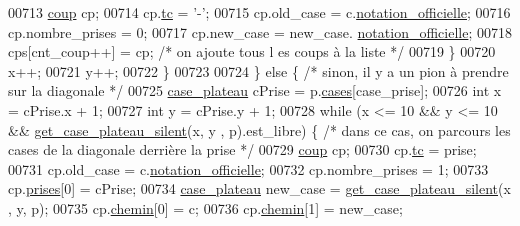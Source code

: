 \begin{DoxyCode}
00713                                         \hyperlink{structcoup}{coup} cp;
00714                                         cp.\hyperlink{structcoup_aa33da004dccb192cb33bc00c26c6e859}{tc} = \textcolor{charliteral}{'-'};
00715                                         cp.old\_case = c.\hyperlink{structcase__plateau_ad510581b324604a9cf685cbb769a421a}{notation_officielle};
00716                                         cp.nombre\_prises = 0;
00717                                         cp.new\_case = new\_case.
      \hyperlink{structcase__plateau_ad510581b324604a9cf685cbb769a421a}{notation_officielle};
00718                                         cps[cnt\_coup++] = cp; \textcolor{comment}{/* on ajoute tous l
      es coups à la liste */}
00719                                 \}
00720                                 x++;
00721                                 y++;
00722                         \}
00723 
00724                 \} \textcolor{keywordflow}{else} \{ \textcolor{comment}{/* sinon, il y a un pion à prendre sur la diagonale */}
00725                         \hyperlink{structcase__plateau}{case_plateau} cPrise = p.\hyperlink{structplateau_a6afaa60f594542e0d742b0c6d3223392}{cases}[case\_prise];
00726                         \textcolor{keywordtype}{int} x = cPrise.x + 1;
00727                         \textcolor{keywordtype}{int} y = cPrise.y + 1;
00728                         \textcolor{keywordflow}{while} (x <= 10 && y <= 10 && \hyperlink{plateau_8h_a60a8f706865d0ae9087f8d65d4667655}{get_case_plateau_silent}(x, y
      , p).est\_libre) \{ \textcolor{comment}{/* dans ce cas, on parcours les cases de la diagonale derrière 
      la prise */}
00729                                 \hyperlink{structcoup}{coup} cp;
00730                                 cp.\hyperlink{structcoup_aa33da004dccb192cb33bc00c26c6e859}{tc} = prise;
00731                                 cp.old\_case = c.\hyperlink{structcase__plateau_ad510581b324604a9cf685cbb769a421a}{notation_officielle};
00732                                 cp.nombre\_prises = 1;
00733                                 cp.\hyperlink{structcoup_ae19b3a66d3f4e66b8f69a38e4005f44a}{prises}[0] = cPrise;
00734                                 \hyperlink{structcase__plateau}{case_plateau} new\_case = \hyperlink{plateau_8h_a60a8f706865d0ae9087f8d65d4667655}{get_case_plateau_silent}(x
      , y, p);
00735                                 cp.\hyperlink{structcoup_aa66b88eb8140c2f459ac92fad0796510}{chemin}[0] = c;
00736                                 cp.\hyperlink{structcoup_aa66b88eb8140c2f459ac92fad0796510}{chemin}[1] = new\_case;

\end{DoxyCode}
